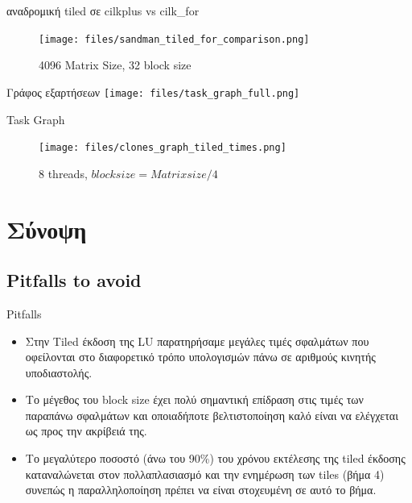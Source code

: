 \documentclass{beamer}
\begin{document}
\begin{frame}
    \begin{block}{αναδρομική tiled σε cilkplus vs cilk\_for}
        \begin{figure}[H]
            \centering
            \texttt{[image: files/sandman\_tiled\_for\_comparison.png]}
            \caption{4096 Matrix Size, 32 block size}
        \end{figure}
    \end{block}
\end{frame}

\begin{frame}{Γράφος εξαρτήσεων}
    \texttt{[image: files/task\_graph\_full.png]}
\end{frame}

\begin{frame}
    \begin{block}{Task Graph}
        \begin{figure}[H]
            \centering
            \texttt{[image: files/clones\_graph\_tiled\_times.png]}
            \caption{8 threads, $block size = Matrix size /4$}
        \end{figure}
    \end{block}
\end{frame}

\section{Σύνοψη}

\subsection{Pitfalls to avoid}
\begin{frame}{Pitfalls}
    \begin{itemize}
            \item<1-> Στην Tiled έκδοση της LU παρατηρήσαμε μεγάλες τιμές
                σφαλμάτων που οφείλονται στο διαφορετικό τρόπο υπολογισμών
                πάνω σε αριθμούς κινητής υποδιαστολής.
            \item<2-> Το μέγεθος του block size έχει πολύ σημαντική επίδραση
                στις τιμές των παραπάνω σφαλμάτων και οποιαδήποτε
                βελτιστοποίηση καλό είναι να ελέγχεται ως προς την ακρίβειά
                της.
            \item<3-> Το μεγαλύτερο ποσοστό (άνω του 90\%) του χρόνου
                εκτέλεσης της tiled έκδοσης καταναλώνεται στον πολλαπλασιασμό
                και την ενημέρωση των tiles (βήμα 4) συνεπώς η παραλληλοποίηση
                πρέπει να είναι στοχευμένη σε αυτό το βήμα.
    \end{itemize}
\end{frame}
\end{document}
